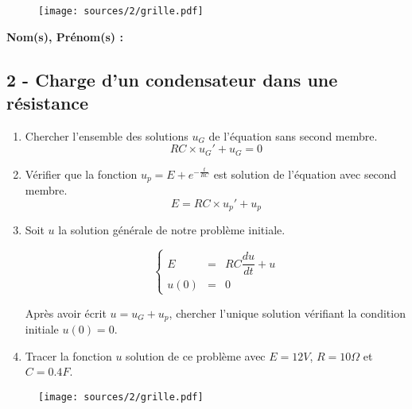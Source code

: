 \documentclass[12pt]{article}
\begin{document}
\begin{figure}[H]
  \centering
  \texttt{[image: sources/2/grille.pdf]}
\end{figure}

\newpage


\textbf{Nom(s), Prénom(s) :}

\subsection*{2 - Charge d'un condensateur dans une résistance}



\begin{enumerate}
\item Chercher l'ensemble des solutions $u_G$ de l'équation sans second membre.
  $$ RC \times u_G' + u_G = 0 $$
\item Vérifier que la fonction $u_p = E + e^{-\frac{t}{RC}}$ est solution de l'équation avec second membre. 
  $$E = RC \times u_p' + u_p$$

\item Soit $u$ la solution générale de notre problème initiale.

  \begin{equation*}
    \left\lbrace
    \begin{array}{ccc}
      E    &=& RC\dfrac{du}{dt} + u\\
      u(0) &=& 0
    \end{array}\right.
  \end{equation*}


  Après avoir écrit $u = u_G + u_p$, chercher l'unique solution vérifiant la condition initiale $u(0) = 0$. 
\item Tracer la fonction $u$ solution de ce problème avec $E = 12V$, $R = 10\Omega$ et $C = 0.4F$.
\end{enumerate}

\begin{figure}[H]
  \centering
  \texttt{[image: sources/2/grille.pdf]}
\end{figure}
\end{document}
